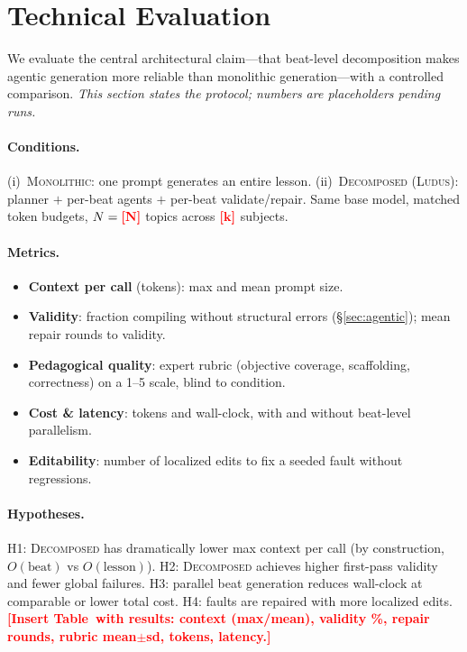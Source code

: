 \documentclass[sigconf,review,anonymous]{acmart}
\newcommand{\PH}[1]{\textcolor{red}{\textbf{[#1]}}}
\newcommand{\sys}{\textsc{Ludus}\xspace}
\begin{document}
\section{Technical Evaluation}
\label{sec:tech}

We evaluate the central architectural claim---that beat-level decomposition
makes agentic generation more reliable than monolithic generation---with a
controlled comparison. \emph{This section states the protocol; numbers are
placeholders pending runs.}

\paragraph{Conditions.} (i)~\textsc{Monolithic}: one prompt generates an entire
lesson. (ii)~\textsc{Decomposed} (\sys): planner $+$ per-beat agents $+$ per-beat
validate/repair. Same base model, matched token budgets, $N=\PH{N}$ topics
across $\PH{k}$ subjects.

\paragraph{Metrics.}
\begin{itemize}
\item \textbf{Context per call} (tokens): max and mean prompt size.
\item \textbf{Validity}: fraction compiling without structural errors
(\S\ref{sec:agentic}); mean repair rounds to validity.
\item \textbf{Pedagogical quality}: expert rubric (objective coverage,
scaffolding, correctness) on a 1--5 scale, blind to condition.
\item \textbf{Cost \& latency}: tokens and wall-clock, with and without
beat-level parallelism.
\item \textbf{Editability}: number of localized edits to fix a seeded fault
without regressions.
\end{itemize}

\paragraph{Hypotheses.} H1: \textsc{Decomposed} has dramatically lower max
context per call (by construction, $O(\text{beat})$ vs $O(\text{lesson})$). H2:
\textsc{Decomposed} achieves higher first-pass validity and fewer global
failures. H3: parallel beat generation reduces wall-clock at comparable or lower
total cost. H4: faults are repaired with more localized edits.
\PH{Insert Table~with results: context (max/mean), validity \%, repair rounds,
rubric mean$\pm$sd, tokens, latency.}
\end{document}
